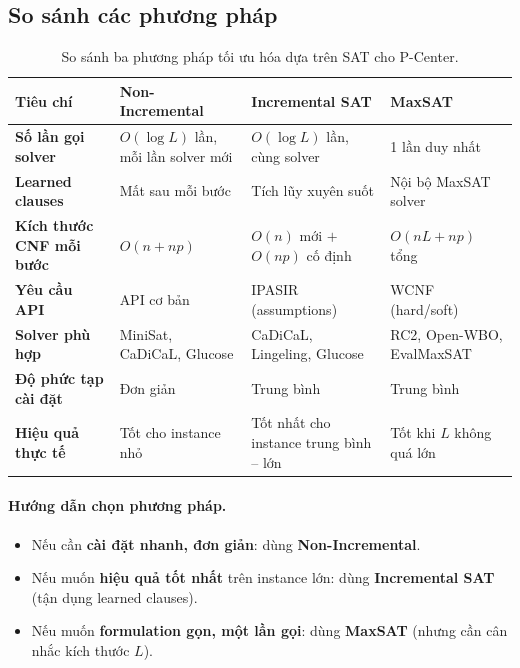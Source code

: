 \documentclass[11pt,a4paper]{article}
\begin{document}
\subsection{So sánh các phương pháp}
\label{sec:comparison}

\begin{table}[h]
\centering
\caption{So sánh ba phương pháp tối ưu hóa dựa trên SAT cho P-Center.}
\label{tab:comparison}
\small
\begin{tabular}{p{3cm} p{3.8cm} p{3.8cm} p{3.8cm}}
\toprule
\textbf{Tiêu chí} & \textbf{Non-Incremental} & \textbf{Incremental SAT} & \textbf{MaxSAT} \\
\midrule
\textbf{Số lần gọi solver} & $O(\log L)$ lần, mỗi lần solver mới & $O(\log L)$ lần, cùng solver & 1 lần duy nhất \\
\addlinespace
\textbf{Learned clauses} & Mất sau mỗi bước & Tích lũy xuyên suốt & Nội bộ MaxSAT solver \\
\addlinespace
\textbf{Kích thước CNF mỗi bước} & $O(n + np)$ & $O(n)$ mới $+$ $O(np)$ cố định & $O(nL + np)$ tổng \\
\addlinespace
\textbf{Yêu cầu API} & API cơ bản & IPASIR (assumptions) & WCNF (hard/soft) \\
\addlinespace
\textbf{Solver phù hợp} & MiniSat, CaDiCaL, Glucose & CaDiCaL, Lingeling, Glucose & RC2, Open-WBO, EvalMaxSAT \\
\addlinespace
\textbf{Độ phức tạp cài đặt} & Đơn giản & Trung bình & Trung bình \\
\addlinespace
\textbf{Hiệu quả thực tế} & Tốt cho instance nhỏ & Tốt nhất cho instance trung bình -- lớn & Tốt khi $L$ không quá lớn \\
\bottomrule
\end{tabular}
\end{table}

\paragraph{Hướng dẫn chọn phương pháp.}
\begin{itemize}[nosep]
    \item Nếu cần \textbf{cài đặt nhanh, đơn giản}: dùng \textbf{Non-Incremental}.
    \item Nếu muốn \textbf{hiệu quả tốt nhất} trên instance lớn: dùng \textbf{Incremental SAT} (tận dụng learned clauses).
    \item Nếu muốn \textbf{formulation gọn, một lần gọi}: dùng \textbf{MaxSAT} (nhưng cần cân nhắc kích thước $L$).
\end{itemize}
\end{document}
